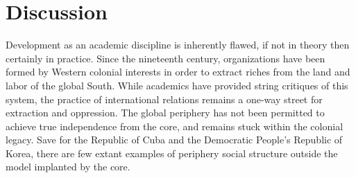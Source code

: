 \documentclass{../../../coursework}
\begin{document}
\section{Discussion}

Development as an academic discipline is inherently flawed, if not in theory
then certainly in practice. Since the nineteenth century, organizations have
been formed by Western colonial interests in order to extract riches from the
land and labor of the global South. While academics have provided string
critiques of this system, the practice of international relations remains a
one-way street for extraction and oppression. The global periphery has not
been permitted to achieve true independence from the core, and remains stuck
within the colonial legacy. Save for the Republic of Cuba and the Democratic
People's Republic of Korea, there are few extant examples of periphery social
structure outside the model implanted by the core.

\printbibliography
\end{document}
